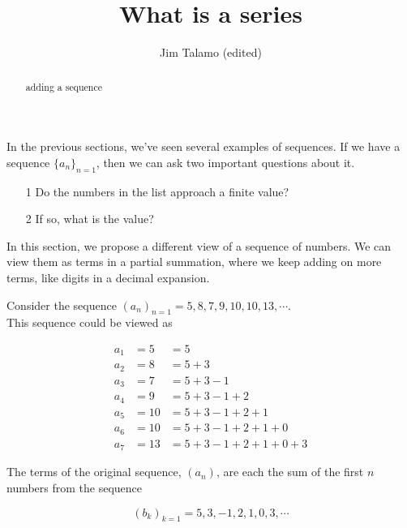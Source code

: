 \documentclass{ximera}
\author{Jim Talamo (edited)}
\title{What is a series}
\begin{document}
\begin{abstract}
adding a sequence
\end{abstract}
\maketitle

In the previous sections, we've seen several examples of sequences.  If we have a sequence $\{a_n\}_{n=1}$, then we can ask two important questions about it.

\begin{itemize}
\item [1] Do the numbers in the list approach a finite value?
\item [2] If so, what is the value?
\end{itemize}



In this section, we propose a different view of a sequence of numbers.  We can view them as terms in a partial summation, where we keep adding on more terms, like digits in a decimal expansion.







\begin{example}


Consider the sequence $(a_n)_{n=1} = 5, 8, 7, 9, 10, 10, 13, \cdots$. \\

This sequence could be viewed as


\begin{align*}
a_1 & = 5  & = 5 \\
a_2 & = 8  & = 5 + 3 \\
a_3 & = 7  & = 5 + 3 - 1 \\
a_4 & = 9  & = 5 + 3 - 1 + 2 \\
a_5 & = 10 & = 5 + 3 - 1 + 2 + 1 \\
a_6 & = 10 & = 5 + 3 - 1 + 2 + 1 + 0 \\
a_7 & = 13 & = 5 + 3 - 1 + 2 + 1 + 0 + 3
\end{align*}


The terms of the original sequence, $(a_n)$, are each the sum of the first $n$ numbers from the sequence 

\[
(b_k)_{k=1} = 5, 3, -1, 2, 1, 0, 3, \cdots
\]





\end{example}
\end{document}
